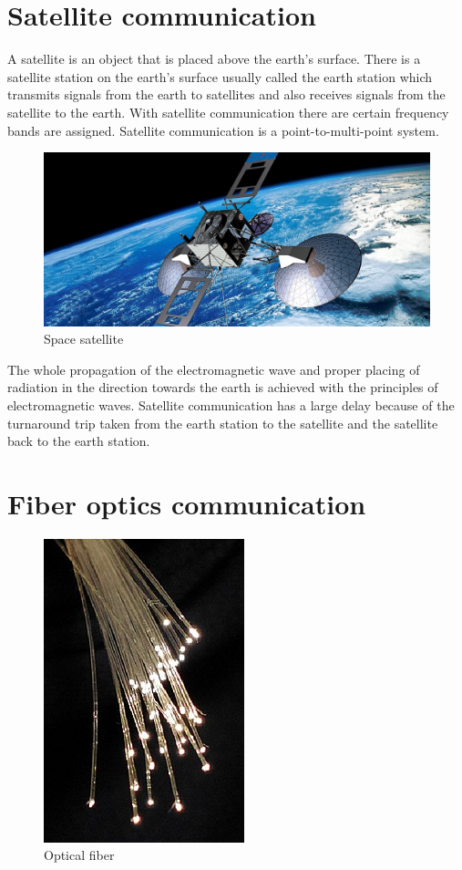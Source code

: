 \section{Satellite communication}
A satellite is an object that is placed above the earth's surface. There is a satellite station on the earth's surface usually called the earth station which transmits signals from the earth to satellites and also receives signals from the satellite to the earth. With satellite communication there are certain frequency bands are assigned. Satellite communication is a point-to-multi-point system.
\begin{figure}[h]
\centering
\includegraphics[scale=0.2]{./graphics/satellite}
\caption{Space satellite}
\end{figure}

The whole propagation of the electromagnetic wave and proper placing of radiation in the direction towards the earth is achieved with the principles of electromagnetic waves. Satellite communication has a large delay because of the turnaround trip taken from the earth station to the satellite and the satellite back to the earth station.

\section{Fiber optics communication}
\begin{figure}[h]
\centering
\includegraphics[scale=0.4]{./graphics/opticalfiber1}
\caption{Optical fiber}
\label{fig:opticalfibre1}
\end{figure}

